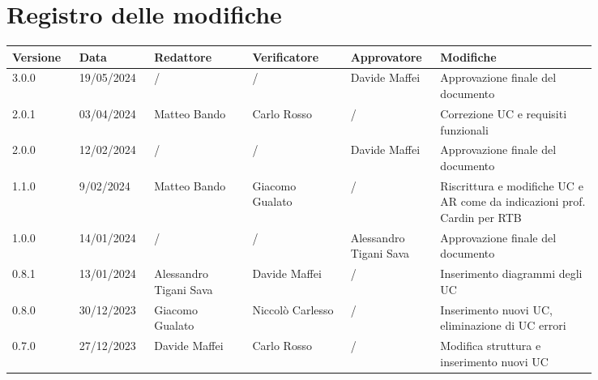 \section*{Registro delle modifiche}


 {
  \renewcommand{\arraystretch}{1.5}
  \scriptsize
  \begin{longtable}{p{0.10\linewidth}p{0.10\linewidth}p{0.15\linewidth}p{0.15\linewidth}p{0.10\linewidth}p{0.24\linewidth}}
	  \textbf{Versione} & \textbf{Data} & \textbf{Redattore}     & \textbf{Verificatore}  & \textbf{Approvatore}   & \textbf{Modifiche}                                                       \\
	  \hline
	  3.0.0             & 19/05/2024    & /                      & /                      & Davide Maffei          & Approvazione finale del documento                                        \\
	  \hline
	  2.0.1             & 03/04/2024    & Matteo Bando           & Carlo Rosso            & /                      & Correzione UC e requisiti funzionali                                     \\
	  \hline
	  2.0.0             & 12/02/2024    & /                      & /                      & Davide Maffei          & Approvazione finale del documento                                        \\
	  \hline
	  1.1.0             & 9/02/2024     & Matteo Bando           & Giacomo Gualato        & /                      & Riscrittura e modifiche UC e AR come da indicazioni prof. Cardin per RTB \\
	  \hline
	  1.0.0             & 14/01/2024    & /                      & /                      & Alessandro Tigani Sava & Approvazione finale del documento                                        \\
	  \hline
	  0.8.1             & 13/01/2024    & Alessandro Tigani Sava & Davide Maffei          & /                      & Inserimento diagrammi degli UC                                           \\
	  \hline
	  0.8.0             & 30/12/2023    & Giacomo Gualato        & Niccolò Carlesso       & /                      & Inserimento nuovi UC, eliminazione di UC errori                          \\
	  \hline
	  0.7.0             & 27/12/2023    & Davide Maffei          & Carlo Rosso            & /                      & Modifica struttura e inserimento nuovi UC                                \\

\end{longtable}}
